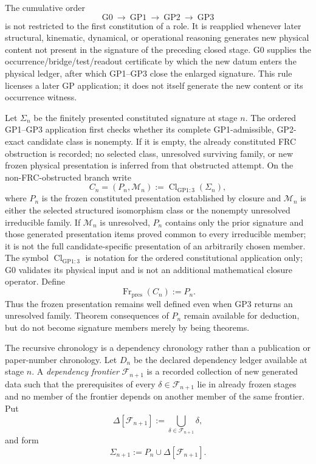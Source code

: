 \documentclass[12pt,a4paper]{article}
\begin{document}
\begin{definition}
\label{p2:def:recursive-gp-application}
The cumulative order
\[
   \mathrm{G0}\ \longrightarrow\ \mathrm{GP1}\ \longrightarrow\
   \mathrm{GP2}\ \longrightarrow\ \mathrm{GP3}
\]
is not restricted to the first constitution of a role.  It is reapplied
whenever later structural, kinematic, dynamical, or operational reasoning
generates new physical content not present in the signature of the preceding
closed stage.  G0 supplies the occurrence/bridge/test/readout certificate by
which the new datum enters the physical ledger, after which GP1--GP3 close the
enlarged signature.  This rule licenses a later GP application; it does not
itself generate the new content or its occurrence witness.

Let \(\Sigma_n\) be the finitely presented constituted signature at stage
\(n\).  The ordered GP1--GP3 application first checks whether its
complete GP1-admissible, GP2-exact candidate class is nonempty.  If it is
empty, the already constituted FRC obstruction is recorded; no selected
class, unresolved surviving family, or new frozen physical presentation
is inferred from that obstructed attempt.  On the non-FRC-obstructed branch
write
\[
   C_n=(P_n,\mathcal M_n)
   :=\operatorname{Cl}_{\mathrm{GP1:3}}(\Sigma_n),
\]
where \(P_n\) is the frozen constituted presentation established by closure
and \(\mathcal M_n\) is either the selected structured isomorphism class
or the nonempty unresolved irreducible family.  If
\(\mathcal M_n\) is unresolved, \(P_n\) contains only the prior signature and
those generated presentation items proved common to every irreducible member; it
is not the full candidate-specific presentation of an arbitrarily chosen
member.  The symbol \(\operatorname{Cl}_{\mathrm{GP1:3}}\) is notation for
the ordered constitutional application only; G0 validates its physical input
and is not an additional mathematical closure operator.  Define
\[
   \operatorname{Fr}_{\mathrm{pres}}(C_n):=P_n.
\]
Thus the frozen presentation remains well defined even when GP3 returns an
unresolved family.  Theorem consequences of \(P_n\) remain available for
deduction, but do not become signature members merely by being theorems.

The recursive chronology is a dependency chronology rather than a publication
or paper-number chronology.  Let \(D_n\) be the declared dependency ledger
available at stage \(n\).  A \emph{dependency frontier}
\(\mathcal F_{n+1}\) is a recorded collection of new generated data such that
the prerequisites of every \(\delta\in\mathcal F_{n+1}\) lie in already
frozen stages and no member of the frontier depends on another member of the
same frontier.  Put
\[
   \Delta[\mathcal F_{n+1}]
   :=\bigcup_{\delta\in\mathcal F_{n+1}}\delta,
\]
and form
\[
   \Sigma_{n+1}
   :=P_n\cup\Delta[\mathcal F_{n+1}].
\]


\end{definition}
\end{document}

